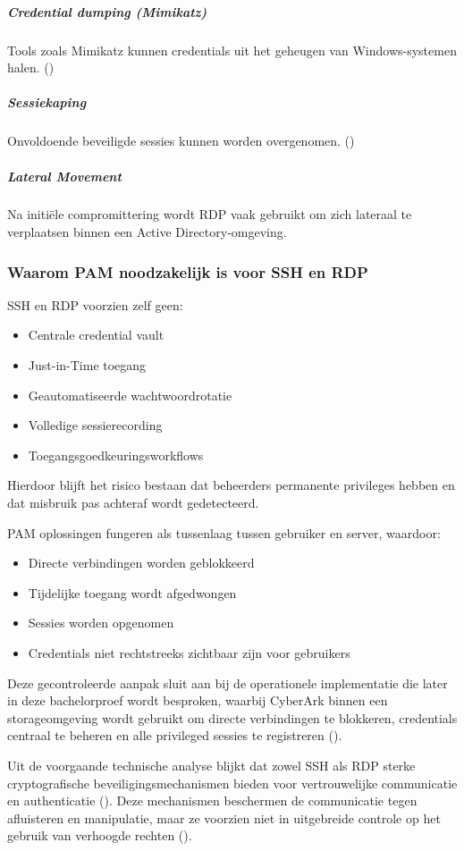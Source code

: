 \subparagraph{Credential dumping (Mimikatz)}
Tools zoals Mimikatz kunnen credentials uit het geheugen van Windows-systemen halen.
(\cite{MITREPassTheHash})

\subparagraph{Sessiekaping}
Onvoldoende beveiligde sessies kunnen worden overgenomen.
(\cite{MicrosoftDigitalDefenseReport2024})

\subparagraph{Lateral Movement}
Na initiële compromittering wordt RDP vaak gebruikt om zich lateraal te verplaatsen binnen een Active Directory-omgeving.

\subsubsection{Waarom PAM noodzakelijk is voor SSH en RDP}
SSH en RDP voorzien zelf geen:
\begin{itemize}
	\item Centrale credential vault
	\item Just-in-Time toegang
	\item Geautomatiseerde wachtwoordrotatie
	\item Volledige sessierecording
	\item Toegangsgoedkeuringsworkflows
\end{itemize}

Hierdoor blijft het risico bestaan dat beheerders permanente privileges hebben en dat misbruik pas achteraf wordt gedetecteerd.

PAM oplossingen fungeren als tussenlaag tussen gebruiker en server, waardoor:
\begin{itemize}
	\item Directe verbindingen worden geblokkeerd
	\item Tijdelijke toegang wordt afgedwongen
	\item Sessies worden opgenomen
	\item Credentials niet rechtstreeks zichtbaar zijn voor gebruikers
\end{itemize}
Deze gecontroleerde aanpak sluit aan bij de operationele implementatie die later in deze bachelorproef wordt besproken, waarbij CyberArk binnen een storageomgeving wordt gebruikt om directe verbindingen te blokkeren, credentials centraal te beheren en alle privileged sessies te registreren (\cite{hsu2021pam}).

Uit de voorgaande technische analyse blijkt dat zowel SSH als RDP sterke cryptografische beveiligingsmechanismen bieden voor vertrouwelijke communicatie en authenticatie (\cite{rfc4251,microsoft_rdp}). Deze mechanismen beschermen de communicatie tegen afluisteren en manipulatie, maar ze voorzien niet in uitgebreide controle op het gebruik van verhoogde rechten (\cite{nist_zta_800_207}).

